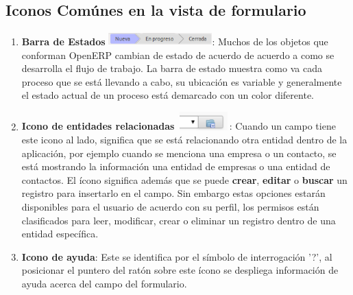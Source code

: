 \begin{itemize}
\end{itemize}


\subsection{Iconos Comúnes en la vista de formulario}
\begin{enumerate}
 \item \textbf{Barra de Estados} \includegraphics[width=4cm,height=0.5cm]{./Imagenes/barraestados.png}:
  Muchos de los objetos que conforman OpenERP cambian de estado de acuerdo de acuerdo a como se desarrolla el
  flujo de trabajo. La barra de estado muestra como va cada proceso que se está llevando a cabo, su ubicación es variable
  y generalmente el estado actual de un proceso está demarcado con un color diferente.
 \item \textbf {Icono de entidades relacionadas} \includegraphics[width=2cm,height=0.7cm]{./Imagenes/entidadesrelacionadas.png}: Cuando un campo tiene este icono al lado,
 significa que se está relacionando otra entidad dentro de la aplicación, por ejemplo cuando se menciona una empresa o un contacto, se está mostrando la información una entidad
 de empresas o una entidad de contactos. El ícono significa además que se puede  \textbf{crear}, \textbf{editar} o \textbf{buscar} un registro para insertarlo en el campo. 
 Sin embargo estas opciones estarán disponibles para el usuario de acuerdo con su perfil, los permisos están clasificados para leer, modificar, crear
 o eliminar un registro dentro de una entidad específica. 
 \item \textbf {Icono de ayuda}: Este se identifica por el símbolo de interrogación '?', al posicionar el puntero del ratón sobre este ícono se despliega información de ayuda acerca del campo del formulario.
\end{enumerate}

